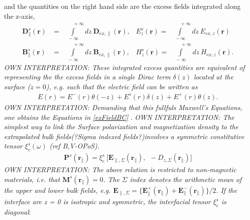 and the quantities on the right hand side are the excess fields integrated along the z-axis,
\begin{subequations}
\label{intExQuant} %
\begin{align}
   \boldsymbol{D}^s_{\parallel}(\boldsymbol{r}) &= \!\!\!\!\!\!\!\!\! \int\limits ^{\:\:\:\:\:\:\:\:\:\:+\infty}_{\!\!\!\!\!\!\!\!\!\!\!\!\!\!\!-\infty} \!\!\!\!\!\!\!\!\! d\!z\: \boldsymbol{D}\!_{ex,\parallel}(\boldsymbol{r}),
   &E^s_{z}(\boldsymbol{r}) = \!\!\!\!\!\!\!\!\! \int\limits ^{\:\:\:\:\:\:\:\:\:\:+\infty}_{\!\!\!\!\!\!\!\!\!\!\!\!\!\!\!-\infty} \!\!\!\!\!\!\!\!\! d\!z\: E\!_{ex,z}(\boldsymbol{r}) \label{intExQuant1}\\
   \boldsymbol{B}^s_{\parallel}(\boldsymbol{r}) &= \!\!\!\!\!\!\!\!\! \int\limits ^{\:\:\:\:\:\:\:\:\:\:+\infty}_{\!\!\!\!\!\!\!\!\!\!\!\!\!\!\!-\infty} \!\!\!\!\!\!\!\!\! d\!z\: \boldsymbol{B}\!_{ex,\parallel}(\boldsymbol{r}),
   &H^s_{z}(\boldsymbol{r}) = \!\!\!\!\!\!\!\!\! \int\limits ^{\:\:\:\:\:\:\:\:\:\:+\infty}_{\!\!\!\!\!\!\!\!\!\!\!\!\!\!\!-\infty} \!\!\!\!\!\!\!\!\! d\!z\: H\!_{ex,z}(\boldsymbol{r}). \label{intExQuant2}
\end{align}
\end{subequations}
\textit{OWN INTERPRETATION: These integrated excess quantities are equivalent of representing the the excess fields in a single Dirac term $\delta (z)$ located at the surface ($z = 0$), e.g. such that the electric field can be 
written as}
%
\begin{align}
   E(r) =  E^-(r) \theta(-z) + E^s(r)\delta (z) +  E^+(r)\theta(z).
\end{align}
%
\textit{OWN INTERPRETATION: Demanding that this fullfuls Maxwell's Equations, one obtains the Equations in \eqref{exFieldBC} }.
\textit{OWN INTERPRETATION: The simplest way to link the Surface polarization and magnetization density to the extrapolated bulk fields(?Sigma indexed fields?)involves a
symmetric constitutive tensor $\xi^s_e(\omega)$ (ref B,V-OPoS).}
\begin{align}
   \boldsymbol{P}^s(\boldsymbol{r}\!_{\parallel}) = \xi ^s_e \: \big[ \boldsymbol{E}_{\parallel, \Sigma}(\boldsymbol{r}\!_{\parallel}), \:\: - D\!_{z, \Sigma}(\boldsymbol{r}\!_{\parallel}) \big]
\end{align}
\textit{OWN INTERPRETATION: The above relation is restricted to non-magnetic materials, i.e. that $\boldsymbol{M}^s(\boldsymbol{r}\!_{\parallel}) = 0$.   The $\Sigma$ index denotes the arithmetic mean of the upper and lower
bulk fields, e.g. $ \boldsymbol{E}_{\parallel, \Sigma} = \big\{ \boldsymbol{E}^+_{\parallel} \!( \boldsymbol{r}\!_{\parallel} ) +  \boldsymbol{E}^-_{\parallel} \! (\boldsymbol{r}\!_{\parallel}) \big\} \big/2 $.
If the interface are z = 0 is isotropic and symmetric, the interfacial tensor $\xi ^s_e$ is diagonal}:
